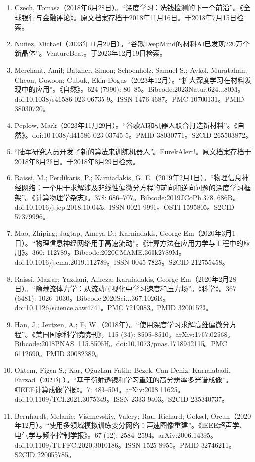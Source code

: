 \begin{enumerate}
\item Czech, Tomasz（2018年6月28日）。“深度学习：洗钱检测的下一个前沿”。《全球银行与金融评论》。原文档案存档于2018年11月16日。于2018年7月15日检索。
\item Nuñez, Michael（2023年11月29日）。“谷歌DeepMind的材料AI已发现220万个新晶体”。VentureBeat。于2023年12月19日检索。
\item Merchant, Amil; Batzner, Simon; Schoenholz, Samuel S.; Aykol, Muratahan; Cheon, Gowoon; Cubuk, Ekin Dogus（2023年12月）。“扩大深度学习在材料发现中的应用”。《自然》。624 (7990): 80–85。Bibcode:2023Natur.624...80M。doi:10.1038/s41586-023-06735-9。ISSN 1476-4687。PMC 10700131。PMID 38030720。
\item Peplow, Mark（2023年11月29日）。“谷歌AI和机器人联合打造新材料”。《自然》。doi:10.1038/d41586-023-03745-5。PMID 38030771。S2CID 265503872。
\item “陆军研究人员开发了新的算法来训练机器人”。EurekAlert!。原文档案存档于2018年8月28日。于2018年8月29日检索。
\item Raissi, M.; Perdikaris, P.; Karniadakis, G. E.（2019年2月1日）。“物理信息神经网络：一个用于求解涉及非线性偏微分方程的前向和逆向问题的深度学习框架”。《计算物理学杂志》。378: 686–707。Bibcode:2019JCoPh.378..686R。doi:10.1016/j.jcp.2018.10.045。ISSN 0021-9991。OSTI 1595805。S2CID 57379996。
\item Mao, Zhiping; Jagtap, Ameya D.; Karniadakis, George Em（2020年3月1日）。“物理信息神经网络用于高速流动”。《计算方法在应用力学与工程中的应用》。360: 112789。Bibcode:2020CMAME.360k2789M。doi:10.1016/j.cma.2019.112789。ISSN 0045-7825。S2CID 212755458。
\item Raissi, Maziar; Yazdani, Alireza; Karniadakis, George Em（2020年2月28日）。“隐藏流体力学：从流动可视化中学习速度和压力场”。《科学》。367 (6481): 1026–1030。Bibcode:2020Sci...367.1026R。doi:10.1126/science.aaw4741。PMC 7219083。PMID 32001523。
\item Han, J.; Jentzen, A.; E, W.（2018年）。“使用深度学习求解高维偏微分方程”。《美国国家科学院院刊》。115 (34): 8505–8510。arXiv:1707.02568。Bibcode:2018PNAS..115.8505H。doi:10.1073/pnas.1718942115。PMC 6112690。PMID 30082389。
\item Oktem, Figen S.; Kar, Oğuzhan Fatih; Bezek, Can Deniz; Kamalabadi, Farzad（2021年）。“基于衍射透镜和学习重建的高分辨率多光谱成像”。《IEEE计算成像学报》。7: 489–504。arXiv:2008.11625。doi:10.1109/TCI.2021.3075349。ISSN 2333-9403。S2CID 235340737。
\item Bernhardt, Melanie; Vishnevskiy, Valery; Rau, Richard; Goksel, Orcun（2020年12月）。“使用多领域模拟训练变分网络：声速图像重建”。《IEEE超声学、电气学与频率控制学报》。67 (12): 2584–2594。arXiv:2006.14395。doi:10.1109/TUFFC.2020.3010186。ISSN 1525-8955。PMID 32746211。S2CID 220055785。

\end{enumerate}
